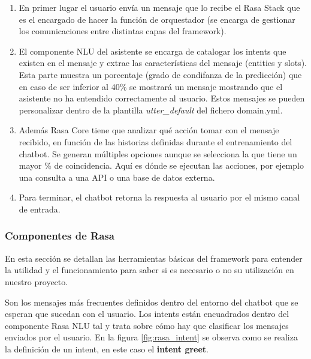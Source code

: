 \begin{enumerate}
    \item En primer lugar el usuario envía un mensaje que lo recibe el Rasa Stack que es el encargado de hacer la función de orquestador (se encarga de gestionar los comunicaciones entre distintas capas del framework).
    \item El componente NLU del asistente se encarga de catalogar los intents que existen en el mensaje y extrae las características del mensaje (entities y slots). Esta parte muestra un porcentaje (grado de condifanza de la predicción) que en caso de ser inferior al 40\% se mostrará un mensaje mostrando que el asistente no ha entendido correctamente al usuario. Estos mensajes se pueden personalizar dentro de la plantilla \textit{utter\_default} del fichero domain.yml.
    \item Además Rasa Core tiene que analizar qué acción tomar con el mensaje recibido, en función de las historias definidas durante el entrenamiento del chatbot. Se generan múltiples opciones aunque se selecciona la que tiene un mayor \% de coincidencia. Aquí es dónde se ejecutan las acciones, por ejemplo una consulta a una API o una base de datos externa.
    \item Para terminar, el chatbot retorna la respuesta al usuario por el mismo canal de entrada.
\end{enumerate}
    
\subsubsection{Componentes de Rasa}

En esta sección se detallan las herramientas básicas del framework para entender la utilidad y el funcionamiento para saber si es necesario o no su utilización en nuestro proyecto.
\vspace{1cm}

Son los mensajes más frecuentes definidos dentro del entorno del chatbot que se esperan que sucedan con el usuario. Los intents están encuadrados dentro del componente Rasa NLU tal y trata sobre cómo hay que clasificar los mensajes enviados por el usuario. En la figura \ref{fig:rasa_intent} se observa como se realiza la definición de un intent, en este caso el \textbf{intent greet}.

